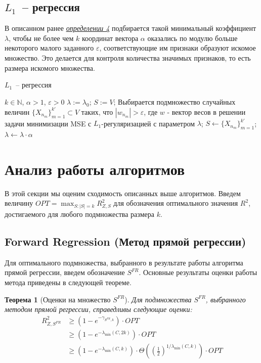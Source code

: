 \documentclass[preprint,12pt]{elsarticle}
\newtheorem{theorem}{Теорема}
\begin{document}
\subsection{$L_1$~-- регрессия}
В описанном ранее  \hyperref[L1]{\textit{определении 4}} подбирается такой минимальный коэффициент $\lambda$, чтобы не более чем $k$ координат вектора $\alpha$ оказались по модулю больше некоторого малого заданного $\varepsilon$, соответствующие им признаки образуют искомое множество. Это делается для контроля количества значимых признаков, то есть размера искомого множества.

\begin{algorithm}[H]
\caption{$L_1$~-- регрессия}\label{algo::fg4}
\begin{algorithmic}[1]
\Require $k \in \mathbb{N}$, $\alpha > 1$, $\varepsilon > 0$
\State $\lambda := \lambda_0$;
\State $S := V$;
\State Выбирается подмножество случайных величин $\{X_{n_m}\}_{m = 1}^{k'} \subset V$ таких, что $|w_{n_m}| > \varepsilon$, где $w$ - вектор весов в решении задачи минимизации MSE с $L_1$-регуляризацией с параметром $\lambda$;
\State $S \gets \{X_{n_m}\}_{m = 1}^{k'}$;
\State $\lambda \gets \lambda \cdot \alpha$
\EndWhile
\end{algorithmic}
\end{algorithm}

\section{Анализ работы алгоритмов}
В этой секции мы оценим сходимость описанных выше алгоритмов. Введем величину $OPT=\max_{S:|S|=k} R_{Z, S}^{2}$ для обозначения оптимального значения $R^2$, достигаемого для любого подмножества размера $k$. 
\subsection{Forward Regression (Метод прямой регрессии)}
Для оптимального подмножества, выбранного в результате работы алгоритма прямой регрессии, введем обозначение $S^{FR}$. Основные результаты оценки работы метода приведены в следующей теореме.
\begin{theorem}[Оценки на множество $S^{FR}$\cite{das2011submodular}]
\label{t1}
Для подмножества $S^{FR}$, выбранного методом прямой регрессии, справедливы следующие оценки:
\begin{equation}\begin{aligned}
R_{Z, S^{F R}}^{2} & \geq\left(1-e^{-\gamma_{S^{F R}, k}}\right) \cdot OPT \\
& \geq\left(1-e^{-\lambda_{\min }(C, 2 k)}\right) \cdot OPT \\
& \geq\left(1-e^{-\lambda_{\min }(C, k)}\right) \cdot \Theta\left(\left(\frac{1}{2}\right)^{1 / \lambda_{\min }(C, k)}\right) \cdot OPT
\end{aligned}\end{equation}
\end{theorem}
\end{document}
